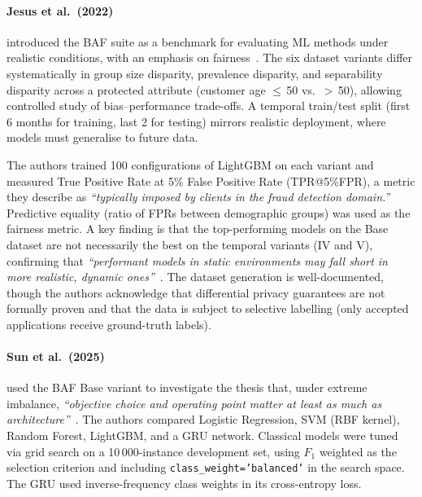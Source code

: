 \paragraph{Jesus et al.\ (2022)}
introduced the BAF suite as a benchmark for evaluating ML methods under realistic conditions, with an emphasis on fairness~\cite{jesus2022turning}. The six dataset variants differ systematically in group size disparity, prevalence disparity, and separability disparity across a protected attribute (customer age $\leq$\,50 vs.\ $>$\,50), allowing controlled study of bias--performance trade-offs. A temporal train/test split (first 6 months for training, last 2 for testing) mirrors realistic deployment, where models must generalise to future data.

The authors trained 100 configurations of LightGBM on each variant and measured True Positive Rate at 5\% False Positive Rate (TPR@5\%FPR), a metric they describe as \emph{``typically imposed by clients in the fraud detection domain.''} Predictive equality (ratio of FPRs between demographic groups) was used as the fairness metric. A key finding is that the top-performing models on the Base dataset are not necessarily the best on the temporal variants (IV and V), confirming that \emph{``performant models in static environments may fall short in more realistic, dynamic ones''}~\cite{jesus2022turning}. The dataset generation is well-documented, though the authors acknowledge that differential privacy guarantees are not formally proven and that the data is subject to selective labelling (only accepted applications receive ground-truth labels).

\paragraph{Sun et al.\ (2025)}
used the BAF Base variant to investigate the thesis that, under extreme imbalance, \emph{``objective choice and operating point matter at least as much as architecture''}~\cite{sun2025objective}. The authors compared Logistic Regression, SVM (RBF kernel), Random Forest, LightGBM, and a GRU network. Classical models were tuned via grid search on a 10\,000-instance development set, using $F_1$ weighted as the selection criterion and including \texttt{class\_weight='balanced'} in the search space. The GRU used inverse-frequency class weights in its cross-entropy loss.

